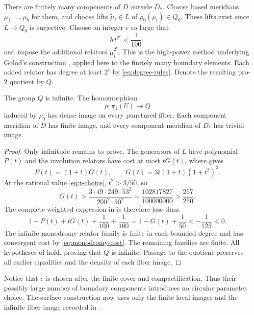 There are finitely many components of $D$ outside $D_*$. Choose based meridians $\mu_1,\ldots,\mu_b$ for them, and choose lifts $\widetilde\mu_i\in L$ of $\rho_0(\mu_i)\in Q_0$. These lifts exist since $L\to Q_0$ is surjective. Choose an integer $e$ so large that
\begin{equation}\label{eq:boundary-cost}
 b\,t^{2^e}<\frac1{100},
\end{equation}
and impose the additional relators $\widetilde\mu_i^{2^e}$.
This is the high-power method underlying Golod's construction
\citep{Golod1964}, applied here to the finitely many boundary elements.
Each added relator has degree at least $2^e$ by
\eqref{eq:degree-rules}. Denote the resulting pro-2 quotient by $Q$.

\begin{proposition}\label{prop:infinite-quotient}
The group $Q$ is infinite. The homomorphism
\[
 \rho:\pi_1(U)\longrightarrow Q
\]
induced by $\rho_0$ has dense image on every punctured fiber. Each component meridian of $D$ has finite image, and every component meridian of $D_*$ has trivial image.
\end{proposition}

\begin{proof}
Only infinitude remains to prove. The generators of $L$ have polynomial $P(t)$ and the involution relators have cost at most $tG(t)$, where  gives
\[
 P(t)=(1+t)G(t),\qquad
 G(t)=3t(1+t)(1+t^2)^2.
\]
At the rational value \eqref{eq:t-choice}, $t^2>3/50$, so
\[
 G(t)>
 \frac{3\cdot49\cdot249\cdot53^2}{200^2\cdot50^2}
 =\frac{102817827}{100000000}
 >\frac{257}{250}.
\]
The complete weighted expression in  is therefore less than
\[
 1-P(t)+tG(t)+\frac1{100}+\frac1{100}
 =1-G(t)+\frac1{50}
 <-\frac1{125}<0.
\]
The infinite monodromy-relator family is finite in each bounded degree and has convergent cost by \eqref{eq:monodromy-cost}. The remaining families are finite. All hypotheses of  hold, proving that $Q$ is infinite. Passage to the quotient preserves all earlier equalities and the density of each fiber image.
\end{proof}

Notice that $e$ is chosen after the finite cover and compactification. Thus their possibly large number of boundary components introduces no circular parameter choice. The surface construction now uses only the finite local images and the infinite fiber image recorded in .
